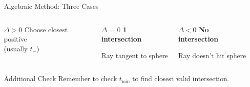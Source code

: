 \begin{frame}{Algebraic Method: Three Cases}
\begin{columns}
\begin{column}{0.33\textwidth}
\begin{conceptbox}{$\Delta > 0$}
                Choose closest positive \\ (usually $t_-$)
            \end{conceptbox}
        \end{column}
        \begin{column}{0.33\textwidth}
            \begin{conceptbox}{$\Delta \text{ = } 0$}
                \textbf{1 intersection}
                \begin{center}
                \end{center}                
                Ray tangent to sphere
                \vspace{0.3cm}
            \end{conceptbox}
        \end{column}
        \begin{column}{0.33\textwidth}
            \begin{conceptbox}{$\Delta < 0$}
                \textbf{No intersection}
                \begin{center}                    
                \end{center}                
                Ray doesn't hit sphere
                \vspace{0.5cm}
            \end{conceptbox}
        \end{column}
    \end{columns}
    
    \vspace{0.5cm}
    \begin{mathbox}{Additional Check}
        Remember to check $t_{\text{min}}$ to find closest valid intersection.
    \end{mathbox}
\end{frame}

